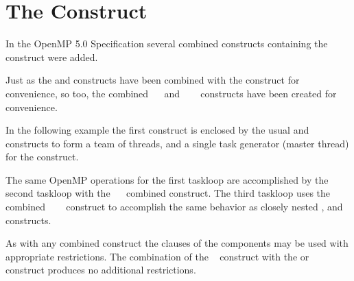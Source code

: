 \pagebreak
\section{The  Construct}
\label{sec:parallel_master_taskloop}

In the OpenMP 5.0 Specification several combined constructs containing
the  construct were added.
   
Just as the  and  constructs have been combined
with the  construct for convenience, so too, the combined
~~ and 
~~~
constructs have been created for convenience.
  
In the following example the first  construct is enclosed
by the usual  and  constructs to form
a team of threads, and a single task generator (master thread) for
the  construct.

The same OpenMP operations for the first taskloop are accomplished by the second
taskloop with the ~~ 
combined construct. 
The third taskloop uses the combined ~~~ 
construct to accomplish the same behavior as closely nested ,
and  constructs.

As with any combined construct the clauses of the components may be used
with appropriate restrictions. The combination of the ~ construct
with the  or ~ construct produces no additional 
restrictions.


